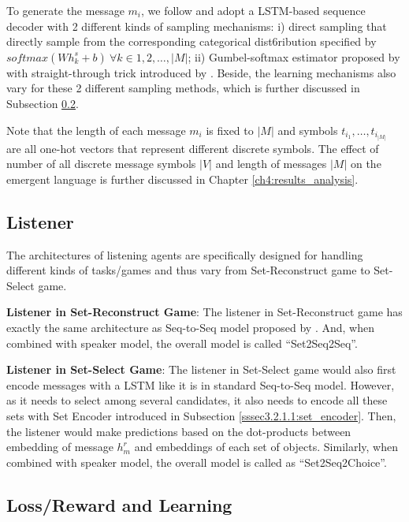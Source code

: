 To generate the message $m_i$, we follow \cite{havrylov2017emergence} and adopt a LSTM-based sequence decoder with 2 different kinds of sampling mechanisms: i) direct sampling that directly sample from the corresponding categorical dist6ribution specified by $softmax(Wh_k^s + b)\ \forall k\in {1, 2, \dots, |M|}$; ii) Gumbel-softmax estimator proposed by \cite{jang2016categorical} with straight-through trick introduced by \cite{bengio2013estimating}. Beside, the learning mechanisms also vary for these 2 different sampling methods, which is further discussed in Subsection \ref{ssec3.2.3:loss_learning}.

Note that the length of each message $m_i$ is fixed to $|M|$ and symbols $t_{i_1},\dots,t_{i_|M|}$ are all one-hot vectors that represent different discrete symbols. The effect of number of all discrete message symbols $|V|$ and length of messages $|M|$ on the emergent language is further discussed in Chapter \ref{ch4:results_analysis}.

\subsection{Listener}
\label{ssec3.2.2:listeners}

The architectures of listening agents are specifically designed for handling different kinds of tasks/games and thus vary from Set-Reconstruct game to Set-Select game.

\noindent\textbf{Listener in Set-Reconstruct Game}: The listener in Set-Reconstruct game has exactly the same architecture as Seq-to-Seq model proposed by \cite{sutskever2014sequence}. And, when combined with speaker model, the overall model is called ``Set2Seq2Seq''.

\noindent\textbf{Listener in Set-Select Game}: The listener in Set-Select game would also first encode messages with a LSTM like it is in standard Seq-to-Seq model. However, as it needs to select among several candidates, it also needs to encode all these sets with Set Encoder introduced in Subsection \ref{sssec3.2.1.1:set_encoder}. Then, the listener would make predictions based on the dot-products between embedding of message $h^r_m$ and embeddings of each set of objects. Similarly, when combined with speaker model, the overall model is called as ``Set2Seq2Choice''.

\subsection{Loss/Reward and Learning}
\label{ssec3.2.3:loss_learning}

